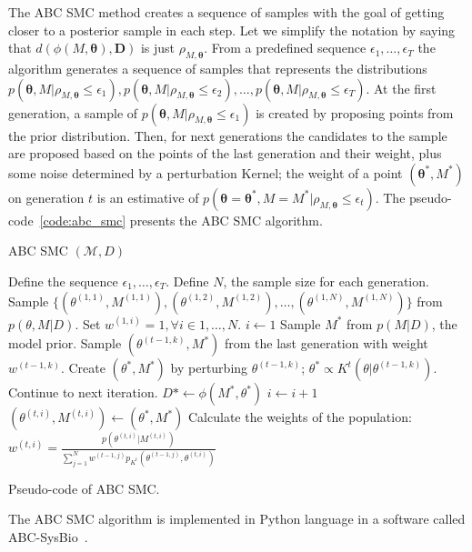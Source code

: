 The ABC SMC method creates a sequence of samples with the goal of 
getting closer to a posterior sample in each step. Let we simplify the
notation by saying that $d(\phi (M, {\bm \theta}), {\bm D})$ is just 
$\rho_{M, {\bm \theta}}$. From a predefined sequence $\epsilon_1,
\ldots, \epsilon_T$ the algorithm generates a sequence of samples that 
represents the distributions $p ({\bm \theta}, M| \rho_{M, {\bm \theta}}
\leq \epsilon_1), p ({\bm \theta}, M| \rho_{M, {\bm \theta}} \leq
\epsilon_2), \ldots, p ({\bm \theta}, M| \rho_{M, {\bm \theta}} \leq
\epsilon_T)$. At the first generation, a sample of $p ({\bm \theta}, M|
\rho_{M, {\bm \theta}} \leq \epsilon_1)$ is created by proposing points
from the prior distribution. Then, for next generations the candidates
to the sample are proposed based on the points of the last generation
and their weight, plus some noise determined by a perturbation Kernel;
the weight of a point $({\bm \theta}^*, M^*)$ on generation $t$ is an
estimative of  $p ({\bm \theta} = {\bm \theta}^*, M = M^* | \rho_{M,
{\bm \theta}} \leq \epsilon_t)$. The pseudo-code~\ref{code:abc_smc}
presents the ABC SMC algorithm.

\begin{algorithm}[h]
\textsc{ABC SMC} $(\mathcal{M}, D)$
\begin{algorithmic}[1]
    \State Define the sequence $\epsilon_1, \ldots, \epsilon_T$.
    \State Define $N$, the sample size for each generation. 
    \State Sample $\{(\theta^{(1, 1)}, M^{(1, 1)}), 
                     (\theta^{(1, 2)}, M^{(1, 2)}), \ldots, 
                     (\theta^{(1, N)}, M^{(1, N)})\}$ from 
                     $p (\theta, M| D)$.
    \State Set $w^{(1, i)} = 1, \forall i \in {1, \ldots, N}$.  
        \State $i \gets 1$
            \State Sample $M^*$ from $p (M | D)$, the model prior.
            \State Sample $(\theta^{(t - 1, k)}, M^*)$ from the 
                last generation with weight $w^{(t - 1, k)}$.
            \State Create $(\theta^*, M^*)$ by perturbing 
                $\theta^{(t - 1, k)}$; 
                $\theta^* \propto K^t(\theta | \theta^{(t - 1, k)})$.
                \State Continue to next iteration.
            \EndIf
            \State $D* \gets \phi (M^*, \theta^*)$
                \State $i \gets i + 1$
                \State $(\theta^{(t, i)}, M^{(t, i)}) \gets 
                    (\theta^*, M^*)$
            \EndIf
        \EndWhile
        \State Calculate the weights of the population:
$                w^{(t, i)} = \frac{p (\theta^{(t, i)} | M^{(t, i)})}
                         {\sum_{j = 1}^N w^{(t-1, j)}p_{K^t}
                            (\theta^{(t-1, j)}, \theta^{(t, i)})}$
    \EndFor
    \Return
\end{algorithmic}
\caption{Pseudo-code of ABC SMC.}
\label{code:abc_smc}
\end{algorithm}
The ABC SMC algorithm is implemented in Python language in a software called 
ABC-SysBio~\cite{Liepe2014}.

